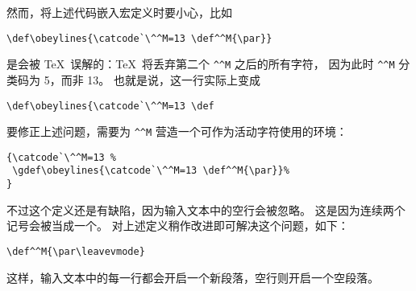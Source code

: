\documentclass{book}
\begin{document}
然而，将上述代码嵌入宏定义时要小心，比如
\begin{verbatim}
\def\obeylines{\catcode`\^^M=13 \def^^M{\par}}
\end{verbatim}
是会被 \TeX\ 误解的：\TeX\ 将丢弃第二个 \verb>^^M> 之后的所有字符，
因为此时 \verb>^^M> 分类码为 5，而非 13。
也就是说，这一行实际上变成
\begin{verbatim}
\def\obeylines{\catcode`\^^M=13 \def
\end{verbatim}
要修正上述问题，需要为 \verb>^^M> 营造一个可作为活动字符使用的环境：
\begin{verbatim}
{\catcode`\^^M=13 %
 \gdef\obeylines{\catcode`\^^M=13 \def^^M{\par}}%
}
\end{verbatim}
不过这个定义还是有缺陷，因为输入文本中的空行会被忽略。
这是因为连续两个  记号会被当成一个。
对上述定义稍作改进即可解决这个问题，如下：
\begin{verbatim}
\def^^M{\par\leavevmode}
\end{verbatim}
这样，输入文本中的每一行都会开启一个新段落，空行则开启一个空段落。
\end{document}

